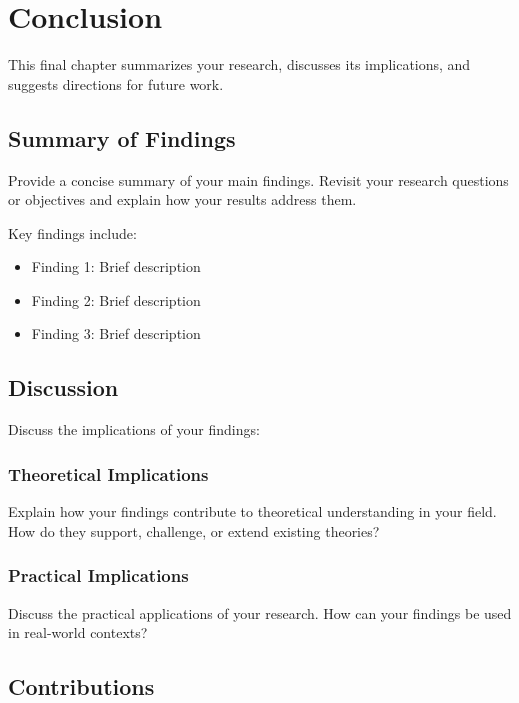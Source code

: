 
\chapter{Conclusion}
\label{conclusion}
\thispagestyle{empty}


This final chapter summarizes your research, discusses its implications, and suggests directions for future work.

\section{Summary of Findings}

Provide a concise summary of your main findings. Revisit your research questions or objectives and explain how your results address them.

Key findings include:
\begin{itemize}
    \item Finding 1: Brief description
    \item Finding 2: Brief description
    \item Finding 3: Brief description
\end{itemize}

\section{Discussion}

Discuss the implications of your findings:

\subsection{Theoretical Implications}

Explain how your findings contribute to theoretical understanding in your field. How do they support, challenge, or extend existing theories?

\subsection{Practical Implications}

Discuss the practical applications of your research. How can your findings be used in real-world contexts?

\section{Contributions}

